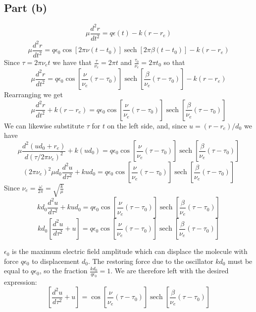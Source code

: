 \documentclass{article}
\DeclareMathOperator{\sech}{sech}
\begin{document}
\subsection{Part (b)}
\[ \mu \frac{d^2 r}{dt^2} = q \epsilon(t) - k(r - r_e) \]
\[ \mu \frac{d^2 r}{dt^2} = q \epsilon_0 \cos\left[2\pi \nu (t - t_0) \right] \sech \left[2 \pi \beta (t - t_0) \right] - k(r - r_e) \]
Since $\tau = 2 \pi \nu_e t$ we have that $\frac{\tau}{\nu_e} = 2 \pi t$
and $\frac{\tau_0}{\nu_e} = 2 \pi t_0$ so that 
\[ \mu \frac{d^2 r}{dt^2} = q \epsilon_0 \cos\left[ \frac{\nu}{\nu_e}(\tau - \tau_0) \right] \sech \left[\frac{\beta}{\nu_e} (\tau - \tau_0) \right] - k(r - r_e) \]
Rearranging we get
\[ \mu \frac{d^2 r}{dt^2} + k(r - r_e)  = q \epsilon_0 \cos\left[ \frac{\nu}{\nu_e}(\tau - \tau_0) \right] \sech \left[\frac{\beta}{\nu_e} (\tau - \tau_0) \right] \]
We can likewise substitute $\tau$ for $t$ on the left side, and, since $u = (r - r_e) /  d_0$ we have
\[ \mu \frac{d^2 (ud_0 + r_e) }{d(\tau/2\pi\nu_e)^2} + k(u d_0)  = q \epsilon_0 \cos\left[ \frac{\nu}{\nu_e}(\tau - \tau_0) \right] \sech \left[\frac{\beta}{\nu_e} (\tau - \tau_0) \right] \]
\[ (2 \pi \nu_e)^2 \mu d_0 \frac{d^2 u}{d\tau^2} + k u d_0  = q \epsilon_0 \cos\left[ \frac{\nu}{\nu_e}(\tau - \tau_0) \right] \sech \left[\frac{\beta}{\nu_e} (\tau - \tau_0) \right] \]
Since $\nu_e = \frac{\omega}{2\pi} = \sqrt{\frac{k}{\mu}}$
\[ k d_0 \frac{d^2 u}{d\tau^2} + k u d_0  = q \epsilon_0 \cos\left[ \frac{\nu}{\nu_e}(\tau - \tau_0) \right] \sech \left[\frac{\beta}{\nu_e} (\tau - \tau_0) \right] \]
\[ k d_0 \left[ \frac{d^2 u}{d\tau^2} + u \right]  = q \epsilon_0 \cos\left[ \frac{\nu}{\nu_e}(\tau - \tau_0) \right] \sech \left[\frac{\beta}{\nu_e} (\tau - \tau_0) \right] \]

$\epsilon_0$ is the maximum electric field amplitude which can displace the molecule with force $q \epsilon_0$ to displacement $d_0$. The restoring force
due to the oscillator $kd_0$ must be equal to $q \epsilon_0$, so the fraction $\frac{kd_0}{q \epsilon_0} = 1$. We are therefore left with the desired expression:
\[\left[ \frac{d^2 u}{d\tau^2} + u \right]  = \cos\left[ \frac{\nu}{\nu_e}(\tau - \tau_0) \right] \sech \left[\frac{\beta}{\nu_e} (\tau - \tau_0) \right] \]
\end{document}
